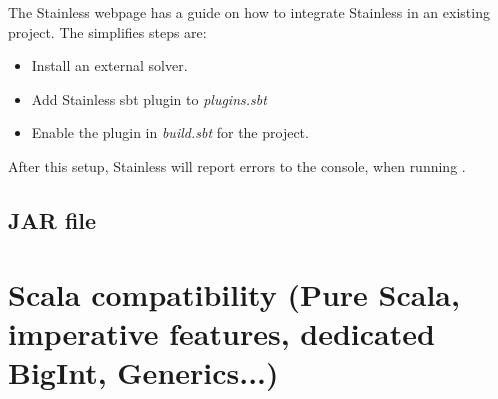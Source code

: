 The Stainless webpage has a guide on how to integrate Stainless in an existing project.
The simplifies steps are:
\begin{itemize}
  \item Install an external solver.
  \item Add Stainless sbt plugin to \emph{plugins.sbt}
  \item Enable the plugin in \emph{build.sbt} for the project.
\end{itemize}
After this setup, Stainless will report errors to the console, when running .

\subsection{JAR file}


\section{Scala compatibility (Pure Scala, imperative features, dedicated BigInt, Generics...)}

